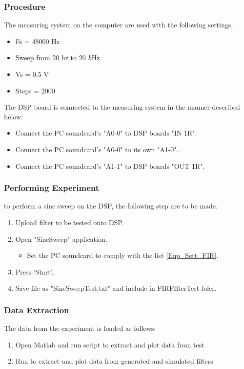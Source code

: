 \subsubsection{Procedure}\label{Eqp_Sett_FIR}

The measuring system on the computer are used with the following settings,
\begin{itemize}
	\item Fs = 48000 Hz
	\item Sweep from 20 hz to 20 $k$Hz
	\item Vs = 0.5 V
	\item Steps = 2000
\end{itemize}

The DSP board is connected to the measuring system in the manner described below:
	\begin{itemize}
		\item Connect the PC soundcard's "A0-0" to DSP boards "IN 1R".
		\item Connect the PC soundcard's "A0-0" to its own "A1-0".
		\item Connect the PC soundcard's "A1-1" to DSP boards "OUT 1R".
	\end{itemize}
	
\subsubsection{Performing Experiment}
to perform a sine sweep on the DSP, the following step are to be made.
	\begin{enumerate}
		\item Upload filter to be tested onto DSP.
		\item Open "SineSweep" application.
		\begin{itemize}
			 \item Set the PC soundcard to comply with the list \autoref{Eqp_Sett_FIR}.
		\end{itemize}
		\item Press 'Start'.
		\item Save file as "SineSweepTest.txt" and include in FIRFIlterTest-foler.
	\end{enumerate}


\subsubsection{Data Extraction}
The data from the experiment is loaded as follows:
	\begin{enumerate}
		\item Open Matlab and run script  to extract and plot data from test
		\item Run  to extract and plot data from generated and simulated filters
	\end{enumerate}

